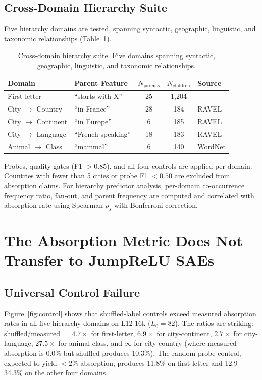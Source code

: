 \documentclass{article}
\begin{document}
\subsection{Cross-Domain Hierarchy Suite}

Five hierarchy domains are tested, spanning syntactic, geographic, linguistic, and taxonomic relationships (Table~\ref{tab:domains}).

\begin{table}[t]
\caption{Cross-domain hierarchy suite. Five domains spanning syntactic, geographic, linguistic, and taxonomic relationships.}
\label{tab:domains}
\centering
\small
\begin{tabular}{llccl}
\toprule
Domain & Parent Feature & $N_{\text{parents}}$ & $N_{\text{children}}$ & Source \\
\midrule
First-letter & ``starts with X'' & 25 & 1,204 & \citet{chanin2024absorption} \\
City $\to$ Country & ``in France'' & 28 & 184 & RAVEL \\
City $\to$ Continent & ``in Europe'' & 6 & 185 & RAVEL \\
City $\to$ Language & ``French-speaking'' & 18 & 183 & RAVEL \\
Animal $\to$ Class & ``mammal'' & 6 & 140 & WordNet \\
\bottomrule
\end{tabular}
\end{table}

Probes, quality gates (F1 $> 0.85$), and all four controls are applied per domain. Countries with fewer than 5 cities or probe F1 $< 0.50$ are excluded from absorption claims. For hierarchy predictor analysis, per-domain co-occurrence frequency ratio, fan-out, and parent frequency are computed and correlated with absorption rate using Spearman $\rho_s$ with Bonferroni correction.


\section{The Absorption Metric Does Not Transfer to JumpReLU SAEs}
\label{sec:metric}

\subsection{Universal Control Failure}

Figure~\ref{fig:control} shows that shuffled-label controls exceed measured absorption rates in all five hierarchy domains on L12-16k ($L_0{=}82$). The ratios are striking: shuffled/measured $= 4.7\times$ for first-letter, $6.9\times$ for city-continent, $2.7\times$ for city-language, $27.5\times$ for animal-class, and $\infty$ for city-country (where measured absorption is 0.0\% but shuffled produces 10.3\%). The random probe control, expected to yield $< 2\%$ absorption, produces 11.8\% on first-letter and 12.9--34.3\% on the other four domains.
\end{document}
